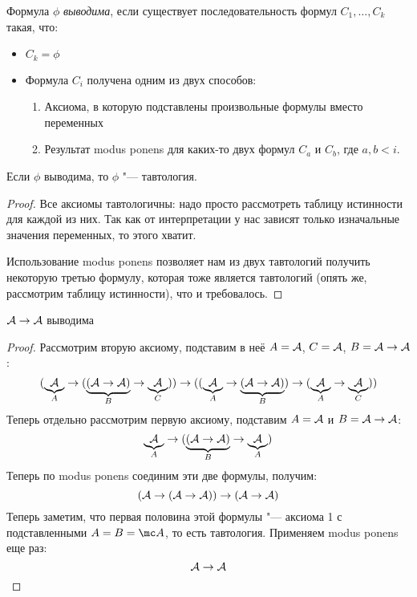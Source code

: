 \begin{Def}
	Формула $\phi$ \textit{выводима}, если существует последовательность формул $C_1, \dots, C_k$ такая, что:
	\begin{itemize}
	\item $C_k = \phi$
	\item Формула $C_i$ получена одним из двух способов:	
		\begin{enumerate}
		\item Аксиома, в которую подставлены произвольные формулы вместо переменных
		\item Результат modus ponens для каких-то двух формул $C_a$ и $C_b$, где $a, b < i$.
		\end{enumerate}
	\end{itemize}
\end{Def}

\begin{theorem}[корректность]
	Если $\phi$ выводима, то $\phi$ "--- тавтология.
\end{theorem}
\begin{proof}
	Все аксиомы тавтологичны: надо просто рассмотреть таблицу истинности для каждой из них.
	Так как от интерпретации у нас зависят только изначальные значения переменных, то этого хватит.

	Использование modus ponens позволяет нам из двух тавтологий получить некоторую третью формулу, которая
	тоже является тавтологий (опять же, рассмотрим таблицу истинности), что и требовалось.
\end{proof}

\begin{lemma}
	$\mathcal A \to \mathcal A$ выводима
\end{lemma}
\begin{proof}
	Рассмотрим вторую аксиому, подставим в неё $A=\mathcal A$, $C=\mathcal A$, $B=\mathcal A \to \mathcal A$:
	\[ (\underbrace{\mathcal A}_A \to (\underbrace{(\mathcal A \to \mathcal A)}_B \to \underbrace{\mathcal A}_C)) \to ((\underbrace{\mathcal A}_A \to \underbrace{(\mathcal A \to \mathcal A)}_B) \to (\underbrace{\mathcal A}_A \to \underbrace{\mathcal A}_C)) \]
	Теперь отдельно рассмотрим первую аксиому, подставим $A=\mathcal A$ и $B=\mathcal A \to \mathcal A$:
	\[ \underbrace{\mathcal A}_A \to (\underbrace{(\mathcal A \to \mathcal A)}_B \to \underbrace{\mathcal A}_A) \]
	Теперь по modus ponens соединим эти две формулы, получим:
	\[ (\mathcal A \to (\mathcal A \to \mathcal A)) \to (\mathcal A \to \mathcal A) \]
	Теперь заметим, что первая половина этой формулы "--- аксиома 1 с подставленными $A=B=\mc A$, то есть тавтология.
	Применяем modus ponens еще раз:
	\[ \mathcal A \to \mathcal A \]
\end{proof}
\TODO

